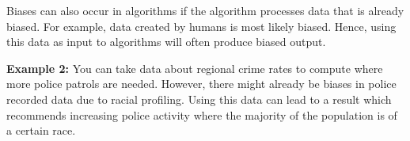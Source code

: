 \documentclass[a4paper]{article}
\begin{document}
Biases can also occur in algorithms if the algorithm processes data that is already biased.
For example, data created by humans is most likely biased.
Hence, using this data as input to algorithms will often produce biased output.

\textbf{Example 2:}
You can take data about regional crime rates to compute where more police patrols are needed.
However, there might already be biases in police recorded data due to racial profiling.
Using this data can lead to a result which recommends increasing police activity where the majority of the population is of a certain race.
\end{document}
